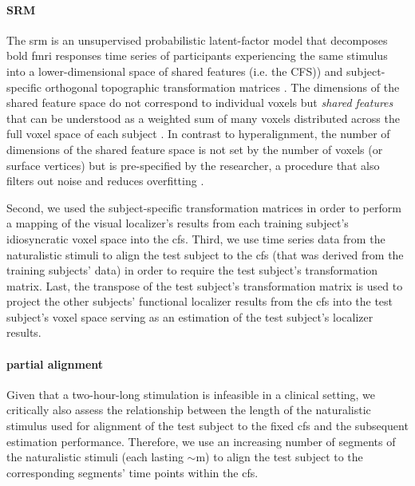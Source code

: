 \paragraph{SRM}
%
The \ac{srm} is an unsupervised probabilistic latent-factor model that
decomposes \ac{bold} \ac{fmri} responses time series of participants
experiencing the same stimulus into a lower-dimensional space of shared features
(i.e. the CFS)) and subject-specific orthogonal topographic
transformation matrices \citep{kumar2020brainiak, cohen2017computational}.
%
The dimensions of the shared feature space do not correspond to individual
voxels but \textit{shared features} that can be understood as a weighted sum of
many voxels distributed across the full voxel space of each subject
\citep{kumar2020brainiak}.
%
In contrast to hyperalignment, the number of dimensions of the shared
feature space is not set by the number of voxels (or surface vertices) but is
pre-specified by the researcher, a procedure that also filters out noise and
reduces overfitting \citep{chen2015reduced}.

Second, we used the subject-specific transformation matrices in order to perform
a mapping of the visual localizer's results from each training subject's
idiosyncratic voxel space into the \ac{cfs}.
Third, we use time series data from the naturalistic stimuli to align the
test subject to the \ac{cfs} (that was derived from the training
subjects' data) in order to require the test subject's transformation matrix.
Last, the transpose of the test subject's transformation matrix is used to
project the other subjects' functional localizer results from the \ac{cfs} into
the test subject's voxel space serving as an estimation of the test subject's
localizer results.


\paragraph{partial alignment}

Given that a two-hour-long stimulation is infeasible in a clinical setting, we
critically also assess the relationship between the length of the naturalistic
stimulus used for alignment of the test subject to the fixed \ac{cfs} and the
subsequent estimation performance.
%
Therefore, we use an increasing number of segments of the naturalistic stimuli
(each lasting $\sim$\unit[15]{m}) to align the test subject to the corresponding
segments' time points within the \ac{cfs}.


